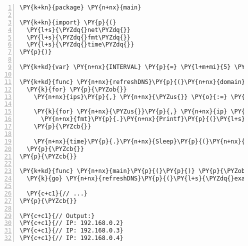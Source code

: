 \begin{Verbatim}[commandchars=\\\{\},numbers=left,firstnumber=1,stepnumber=1,frame=single]
\PY{k+kn}{package} \PY{n+nx}{main}

\PY{k+kn}{import} \PY{p}{(}
  \PY{l+s}{\PYZdq{}net\PYZdq{}}
  \PY{l+s}{\PYZdq{}fmt\PYZdq{}}
  \PY{l+s}{\PYZdq{}time\PYZdq{}}
\PY{p}{)}

\PY{k+kd}{var} \PY{n+nx}{INTERVAL} \PY{p}{=} \PY{l+m+mi}{5} \PY{o}{*} \PY{n+nx}{time}\PY{p}{.}\PY{n+nx}{Second}

\PY{k+kd}{func} \PY{n+nx}{refreshDNS}\PY{p}{(}\PY{n+nx}{domain} \PY{k+kt}{string}\PY{p}{)} \PY{p}{\PYZob{}}
  \PY{k}{for} \PY{p}{\PYZob{}}
    \PY{n+nx}{ips}\PY{p}{,} \PY{n+nx}{\PYZus{}} \PY{o}{:=} \PY{n+nx}{net}\PY{p}{.}\PY{n+nx}{LookupIP}\PY{p}{(}\PY{n+nx}{domain}\PY{p}{)}

    \PY{k}{for} \PY{n+nx}{\PYZus{}}\PY{p}{,} \PY{n+nx}{ip} \PY{o}{:=} \PY{k}{range} \PY{n+nx}{ips} \PY{p}{\PYZob{}}
      \PY{n+nx}{fmt}\PY{p}{.}\PY{n+nx}{Printf}\PY{p}{(}\PY{l+s}{\PYZdq{}IP: \PYZpc{}s\PYZbs{}n\PYZdq{}}\PY{p}{,} \PY{n+nx}{ip}\PY{p}{.}\PY{n+nx}{String}\PY{p}{(}\PY{p}{)}\PY{p}{)}
    \PY{p}{\PYZcb{}}

    \PY{n+nx}{time}\PY{p}{.}\PY{n+nx}{Sleep}\PY{p}{(}\PY{n+nx}{INTERVAL}\PY{p}{)}
  \PY{p}{\PYZcb{}}
\PY{p}{\PYZcb{}}

\PY{k+kd}{func} \PY{n+nx}{main}\PY{p}{(}\PY{p}{)} \PY{p}{\PYZob{}}
  \PY{k}{go} \PY{n+nx}{refreshDNS}\PY{p}{(}\PY{l+s}{\PYZdq{}example.cluster.internal\PYZdq{}}\PY{p}{)}

  \PY{c+c1}{// ...}
\PY{p}{\PYZcb{}}

\PY{c+c1}{// Output:}
\PY{c+c1}{// IP: 192.168.0.2}
\PY{c+c1}{// IP: 192.168.0.3}
\PY{c+c1}{// IP: 192.168.0.4}
\end{Verbatim}
